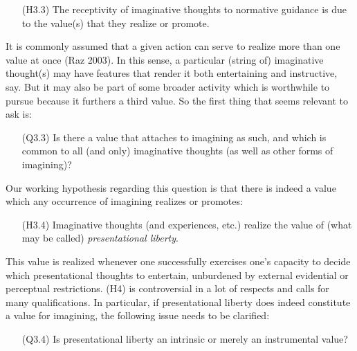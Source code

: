 \vspace{-.1cm}
\begin{itemize}[leftmargin=2cm]
\item[(H3.3)] The receptivity of imaginative thoughts to normative guidance is due to the value(s) that they realize or promote.
\end{itemize}
\vspace{-.1cm}

\noindent It is commonly assumed that a given action can serve to realize more than one value at once (Raz 2003). In this sense, a particular (string of) imaginative thought(s) may have features that render it both entertaining and instructive, say. But it may also be part of some broader activity which is worthwhile to pursue because it furthers a third value. So the first thing that seems relevant to ask is:

\vspace{-.1cm}
\begin{itemize}[leftmargin=2cm]
\item[(Q3.3)] Is there a value that attaches to imagining as such, and which is common to all (and only) imaginative thoughts (as well as other forms of imagining)?
\end{itemize}
\vspace{-.1cm}

\noindent Our working hypothesis regarding this question is that there is indeed a value which any occurrence of imagining realizes or promotes:

\vspace{-.1cm}
\begin{itemize}[leftmargin=2cm]
\item[(H3.4)] Imaginative thoughts (and experiences, etc.) realize the value of (what may be called) \emph{presentational liberty}.
\end{itemize}
\vspace{-.1cm}

\noindent This value is realized whenever one successfully exercises one's capacity to decide which presentational thoughts to entertain, unburdened by external evidential or perceptual restrictions. (H4) is controversial in a lot of respects and calls for many qualifications. In particular, if presentational liberty does indeed constitute a value for imagining, the following issue needs to be clarified:

\vspace{-.1cm}
\begin{itemize}[leftmargin=2cm]
\item[(Q3.4)] Is presentational liberty an intrinsic or merely an instrumental value?
\end{itemize}
\vspace{-.1cm}

